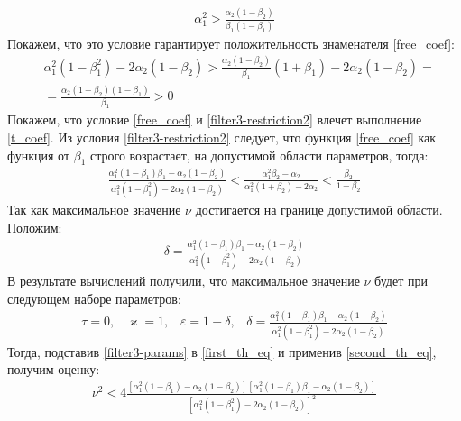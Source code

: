 \documentclass[a4paper,article,14pt]{extarticle}
\begin{document}
\begin{equation}\label{filter3-restriction2}
 \begin{aligned}
\alpha_1^2 > \frac{\alpha_2(1-\beta_2)}{\beta_1(1-\beta_1)}
 \end{aligned}
 \end{equation}
Покажем, что это условие гарантирует положительность знаменателя \eqref{free_coef}:
\begin{equation}
 \begin{aligned}
&\alpha_1^2(1-\beta_1^2) - 2\alpha_2(1-\beta_2) > \frac{\alpha_2(1-\beta_2)}{\beta_1}(1+\beta_1) - 2\alpha_2(1-\beta_2) =\\
&= \frac{\alpha_2(1-\beta_2)(1 - \beta_1)}{\beta_1} > 0
 \end{aligned}
\end{equation}
Покажем, что условие \eqref{free_coef} и \eqref{filter3-restriction2} влечет выполнение \eqref{t_coef}. Из условия \eqref{filter3-restriction2} следует, что функция \eqref{free_coef} как функция от  $\beta_1$ строго возрастает, на допустимой области параметров, тогда:
 \begin{align}
\frac{\alpha_1^2(1-\beta_1)\beta_1 - \alpha_2(1-\beta_2)}{\alpha_1^2(1-\beta_1^2) - 2\alpha_2(1-\beta_2)} < \frac{\alpha_1^2\beta_2 - \alpha_2}{\alpha_1^2(1+\beta_2) - 2\alpha_2} < \frac{\beta_2}{1+\beta_2}
 \end{align}
Так как максимальное значение $\nu$ достигается на границе допустимой области. Положим:
 \begin{equation}\label{filter3_positive_numerator}
 \begin{aligned}
\delta = \frac{\alpha_1^2(1-\beta_1)\beta_1 - \alpha_2(1-\beta_2)}{\alpha_1^2(1-\beta_1^2) - 2\alpha_2(1-\beta_2)}
 \end{aligned}
 \end{equation}
В результате вычислений получили, что максимальное значение $\nu$ будет при следующем наборе параметров:
\begin{equation}\label{filter3-params}
 \begin{aligned}
 \tau = 0 \text{,} \quad
 \varkappa = 1 \text{,} \quad
 \varepsilon = 1-\delta \text{,} \quad
 \delta = \frac{\alpha_1^2(1-\beta_1)\beta_1 - \alpha_2(1-\beta_2)}{\alpha_1^2(1-\beta_1^2) - 2\alpha_2(1-\beta_2)}
 \end{aligned}
\end{equation}
Тогда, подставив \eqref{filter3-params} в \eqref{first_th_eq} и применив \eqref{second_th_eq}, получим оценку:
 \begin{equation}
 \begin{aligned}
\nu^2 < 4\frac{[\alpha_1^2(1-\beta_1) - \alpha_2(1-\beta_2)][\alpha_1^2(1-\beta_1)\beta_1 - \alpha_2(1-\beta_2)]}{[\alpha_1^2(1-\beta_1^2) - 2\alpha_2(1-\beta_2)]^2}
 \end{aligned}
 \end{equation}
 
\end{document}
